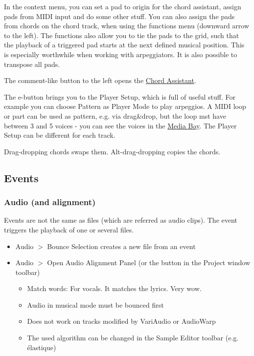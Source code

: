 \documentclass[10pt]{article}
\begin{document}
In the context menu, you can set a pad to origin for the chord assistant, assign pads from MIDI input and do some other stuff. You can also assign the pads from chords on the chord track, when using the functions menu (downward arrow to the left). The functions also allow you to tie the pads to the grid, such that the playback of a triggered pad starts at the next defined musical position. This is especially worthwhile when working with arpeggiators. It is also possible to transpose all pads.

The comment-like button to the left opens the \hyperlink{ChordAssistant}{Chord Assistant}.

The e-button brings you to the Player Setup, which is full of useful stuff. For example you can choose Pattern as Player Mode to play arpeggios. A MIDI loop or part can be used as pattern, e.g. via drag\&drop, but the loop mst have between 3 and 5 voices - you can see the voices in the \hyperlink{MediaBay}{Media Bay}. The Player Setup can be different for each track.

Drag-dropping chords swaps them. Alt-drag-dropping copies the chords.

\subsection{Events}

\subsubsection{Audio (and alignment)}

Events are not the same as files (which are referred as audio clips). The event triggers the playback of one or several files.

\begin{itemize}
	\item Audio $>$ Bounce Selection creates a new file from an event
	\item Audio $>$ Open Audio Alignment Panel (or the button in the Project window toolbar)
	\begin{itemize}
		\item Match words: For vocals. It matches the lyrics. Very wow.
		\item Audio in musical mode must be bounced first
		\item Does not work on tracks modified by VariAudio or AudioWarp
		\item The used algorithm can be changed in the Sample Editor toolbar (e.g. élastique)
	\end{itemize}
\end{itemize}
\end{document}
